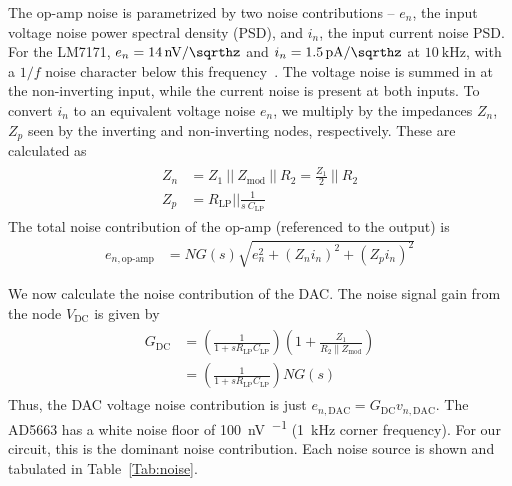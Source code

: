\documentclass[aip,rsi,reprint]{revtex4-1} %
\newcommand{\epar}{~||~} %
\begin{document}
The op-amp noise is parametrized by two noise contributions -- $e_n$, the input voltage noise power spectral density (PSD), and $i_n$, the input current noise PSD.
For the LM7171, $e_n = \SI[per-mode=symbol]{14}{\nano\volt\per\sqrthz}$ and $i_n = \SI[per-mode=symbol]{1.5}{\pico\ampere\per\sqrthz}$ at $\SI{10}{\kilo\hertz}$, with a $1/f$ noise character below this frequency~\cite{LM7171Datasheet}.
The voltage noise is summed in at the non-inverting input, while the current noise is present at both inputs.
To convert $i_n$ to an equivalent voltage noise $e_n$, we multiply by the impedances $Z_n$, $Z_p$ seen by the inverting and non-inverting nodes, respectively.
These are calculated as
\begin{align}
\begin{split}
\label{Eq:ZnZp}
Z_n &= Z_1 \epar Z_{\text{mod}} \epar  R_2   = \frac{Z_1}{2} \epar R_2 \\
Z_p &= R_{\text{LP}}  \big|\big|\frac{1}{s~C_{\text{LP}}}
\end{split}
\end{align}
The total noise contribution of the op-amp (referenced to the output) is
\begin{align}
\label{Eq:OpAmpNoise}
e_{n,\text{op-amp}} &= NG(s)\sqrt{e_n^2 + (Z_n i_n)^2 + (Z_p i_n)^2}
\end{align}

We now calculate the noise contribution of the DAC.
The noise signal gain from the node $V_{\text{DC}}$ is given by
\begin{align}
\begin{split}
\label{Eq:Gdc}
G_{\text{DC}} &= \left(\frac{1}{1+sR_{\text{LP}}C_{\text{LP}}}\right)\left(1+\frac{Z_1}{R_2\epar Z_{\text{mod}}}\right) \\
&= \left(\frac{1}{1+sR_{\text{LP}}C_{\text{LP}}}\right)NG(s)
\end{split}
\end{align}
Thus, the DAC voltage noise contribution is just $e_{n,\text{DAC}} = G_{\text{DC}} v_{n,\text{DAC}}$. The AD5663 has a white noise floor of \SI[per-mode=symbol]{100}{\nano\volt\per\sqrthz} (\SI{1}{\kilo\hertz} corner frequency).
For our circuit, this is the dominant noise contribution.
Each noise source is shown and tabulated in Table~\ref{Tab:noise}.
\end{document}
